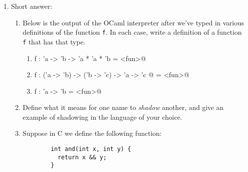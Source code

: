 \documentclass[11pt]{article}
\begin{document}
  \begin{enumerate}


    \item Short answer:

      \vspace{-2.5mm}

      \begin{enumerate}

        \addtolength{\itemsep}{1.75in}

        \item Below is the output of the OCaml interpreter after we've typed
              in various definitions of the function \texttt{f}.  In each
              case, write a definition of a function \texttt{f} that has
              that type.

              \begin{enumerate}

                \addtolength{\itemsep}{1in}

                \item \verb@val f : 'a -> 'b -> 'a * 'a * 'b = <fun>@

                \item \verb@val f : ('a -> 'b) -> ('b -> 'c) -> 'a -> 'c @%
                      \verb@= <fun>@

                \item \verb@val f : 'a -> 'b = <fun>@

              \end{enumerate}

              \vspace{-.5in}

        \item Define what it means for one name to \textit{shadow} another,
              and give an example of shadowing in the language of your
              choice.

        \item Suppose in C we define the following function:\hspace{1mm}
              \begin{minipage}[t]{2in}

                \begin{Verbatim}
        int and(int x, int y) {
          return x && y;
        }
                \end{Verbatim}


\end{minipage}
\end{enumerate}
\end{enumerate}
\end{document}
